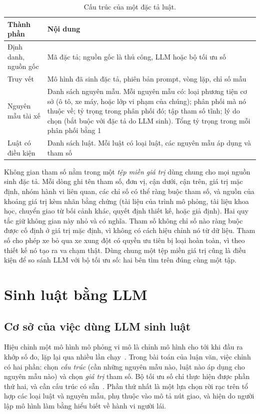 \documentclass[../main.tex]{subfiles}
\begin{document}
\begin{table}[!htbp]
\centering
\small
\caption{Cấu trúc của một đặc tả luật.}
\label{table:3.1a}
\begin{tabular}{|p{3.4cm}|p{10.6cm}|}
\hline
\textbf{Thành phần} & \textbf{Nội dung} \\
\hline
Định danh, nguồn gốc & Mã đặc tả; nguồn gốc là thủ công, LLM hoặc bộ tối ưu số \\
\hline
Truy vết & Mô hình đã sinh đặc tả, phiên bản prompt, vòng lặp, chỉ số mẫu \\
\hline
Nguyên mẫu tài xế & Danh sách nguyên mẫu. Mỗi nguyên mẫu có: loại phương tiện cơ sở (ô tô, xe máy, hoặc lớp vi phạm của chúng); phân phối mà nó thuộc về; tỷ trọng trong phân phối đó; tập tham số tĩnh; lý do chọn (bắt buộc với đặc tả do LLM sinh). Tổng tỷ trọng trong mỗi phân phối bằng 1 \\
\hline
Luật có điều kiện & Danh sách luật. Mỗi luật có loại luật, các nguyên mẫu áp dụng và tham số \\
\hline
\end{tabular}
\end{table}

Không gian tham số nằm trong một \emph{tệp miền giá trị} dùng chung cho mọi nguồn sinh đặc tả. Mỗi dòng ghi tên tham số, đơn vị, cận dưới, cận trên, giá trị mặc định, nhóm hành vi liên quan, các chỉ số có thể ràng buộc tham số, và nguồn của khoảng giá trị kèm nhãn bằng chứng (tài liệu của trình mô phỏng, tài liệu khoa học, chuyển giao từ bối cảnh khác, quyết định thiết kế, hoặc giả định). Hai quy tắc giữ không gian này nhỏ và có nghĩa. Tham số không chỉ số nào ràng buộc được cố định ở giá trị mặc định, vì không có cách hiệu chỉnh nó từ dữ liệu. Tham số cho phép xe bỏ qua xe xung đột có quyền ưu tiên bị loại hoàn toàn, vì theo thiết kế nó tạo ra va chạm thật. Dùng chung một tệp miền giá trị cũng là điều kiện để so sánh LLM với bộ tối ưu số: hai bên tìm trên đúng cùng một tập.

\section{Sinh luật bằng LLM}
\label{section:rg_llm}

\subsection{Cơ sở của việc dùng LLM sinh luật}

Hiệu chỉnh một mô hình mô phỏng vi mô là chỉnh mô hình cho tới khi đầu ra khớp số đo, lặp lại qua nhiều lần chạy~\cite{hollander2008calibration}. Trong bài toán của luận văn, việc chỉnh có hai phần: chọn \emph{cấu trúc} (cần những nguyên mẫu nào, luật nào áp dụng cho nguyên mẫu nào) và chọn \emph{giá trị} tham số. Bộ tối ưu số chỉ thực hiện được phần thứ hai, và cần cấu trúc có sẵn~\cite{akiba2019optuna}. Phần thứ nhất là một lựa chọn rời rạc trên tổ hợp các loại luật và nguyên mẫu, phụ thuộc vào mô tả nút giao, và hiện do người lập mô hình làm bằng hiểu biết về hành vi người lái.
\end{document}
